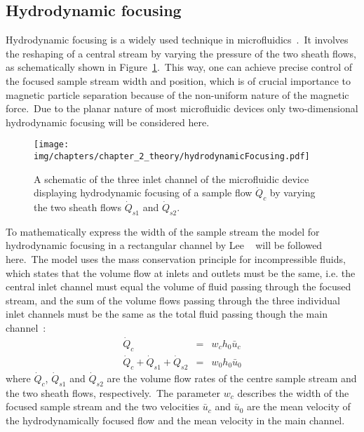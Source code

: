 \subsection{Hydrodynamic focusing}\label{subsec:hydrodynamicFocusing}
Hydrodynamic focusing is a widely used technique in microfluidics~\cite{Golden2012,Dziubinski2015}.\ It involves the reshaping of a central stream by varying the pressure of the two sheath flows, as schematically shown in Figure~\ref{fig:hydrodynamicFocusingSchematic}.\ This way, one can achieve precise control of the focused sample stream width and position, which is of crucial importance to magnetic particle separation because of the non-uniform nature of the magnetic force.\ Due to the planar nature of most microfluidic devices only two-dimensional hydrodynamic focusing will be considered here.\
\begin{figure}[htb]
\centering
   \texttt{[image: img/chapters/chapter\_2\_theory/hydrodynamicFocusing.pdf]}
	\caption[Hydrodynamic focusing schematic in a three inlet fluidic device]{A schematic of the three inlet channel of the microfluidic device displaying hydrodynamic focusing of a sample flow $\dot{Q}_{c}$ by varying the two sheath flows $\dot{Q}_{s1}$ and $\dot{Q}_{s2}$.}%
\label{fig:hydrodynamicFocusingSchematic}%
\end{figure} 
To mathematically express the width of the sample stream the model for hydrodynamic focusing in a rectangular channel by Lee \etal{}~\cite{Lee2006} will be followed here.\ The model uses the mass conservation principle for incompressible fluids, which states that the volume flow at inlets and outlets must be the same, i.e. the central inlet channel must equal the volume of fluid passing through the focused stream, and the sum of the volume flows passing through the three individual inlet channels must be the same as the total fluid passing though the main channel~\cite{Lee2006}:\
\begin{eqnarray}
	\dot{Q}_{c} &=& w_{c}h_{0}\bar{u}_{c} \label{eqn:sampleFlowMassConvervation} \\
	\dot{Q}_{c} + \dot{Q}_{s1}+ \dot{Q}_{s2} &=& w_{0}h_{0}\bar{u}_{0} \label{eqn:totalFlowMassConvervation}
\end{eqnarray} 
where  $\dot{Q}_{c}$,  $\dot{Q}_{s1}$ and  $\dot{Q}_{s2}$ are the volume flow rates of the centre sample stream and the two sheath flows, respectively.\ The parameter $w_{c}$ describes the width of the focused sample stream and the two velocities $\bar{u}_{c}$ and $\bar{u}_{0}$ are the mean velocity of the hydrodynamically focused flow and the mean velocity in the main channel.\\

